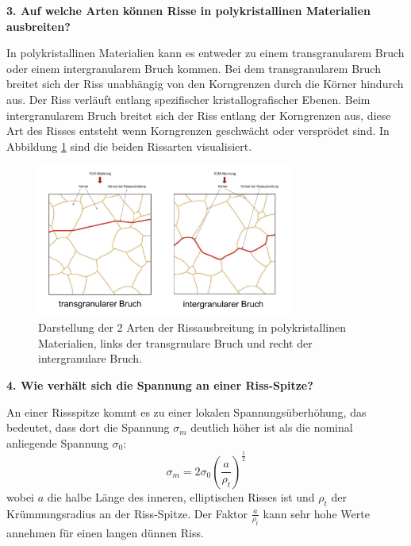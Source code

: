 \noindent\textbf{3. Auf welche Arten können Risse in polykristallinen Materialien ausbreiten?}\\
\begin{addmargin}[25pt]{0pt}
In polykristallinen Materialien kann es entweder zu einem transgranularem Bruch oder einem intergranularem Bruch kommen. Bei dem transgranularem Bruch breitet sich der Riss unabhängig von den Korngrenzen durch die Körner hindurch aus. Der Riss verläuft entlang spezifischer kristallografischer Ebenen. Beim intergranularem Bruch breitet sich der Riss entlang der Korngrenzen aus, diese Art des Risses entsteht wenn Korngrenzen geschwächt oder versprödet sind. In Abbildung \ref{fig:Rissausbreitung_polykristallin} sind die beiden Rissarten visualisiert.\\
\begin{figure}[h]
    \centering
    \includegraphics[width = 0.75\textwidth]{images/Materialwissenschaften/Rissausbreitung_polykristallin.jpeg}
    \caption{Darstellung der 2 Arten der Rissausbreitung in polykristallinen Materialien, links der transgrnulare Bruch und recht der intergranulare Bruch.}
    \label{fig:Rissausbreitung_polykristallin}
\end{figure}
\end{addmargin}

\noindent\textbf{4. Wie verhält sich die Spannung an einer Riss-Spitze?}\\
\begin{addmargin}[25pt]{0pt}
An einer Rissspitze kommt es zu einer lokalen Spannungsüberhöhung, das bedeutet, dass dort die Spannung $\sigma_m$ deutlich höher ist als die nominal anliegende Spannung $\sigma_0$:
\begin{equation}\label{eq:Spannung_Rissspitze}
\sigma_m = 2\sigma_0 \left( \frac{a}{\rho_t}\right)^\frac{1}{2}
\end{equation}
wobei $a$ die halbe Länge des inneren, elliptischen Risses ist und $\rho_t$ der Krümmungsradius an der Riss-Spitze. Der Faktor $\frac{a}{\rho_t}$ kann sehr hohe Werte annehmen für einen langen dünnen Riss.\\
\end{addmargin}


